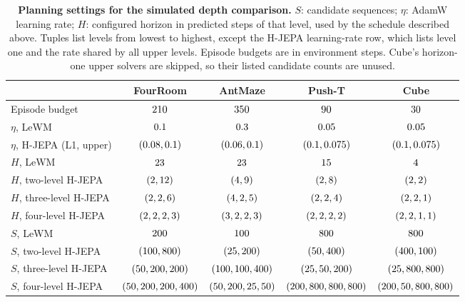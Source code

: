 \begin{table}[ht]
\centering
\small
\setlength{\tabcolsep}{3.5pt}   
\caption{\textbf{Planning settings for the simulated depth comparison.}
$S$: candidate sequences; $\eta$: AdamW learning rate; $H$: configured horizon
in predicted steps of that level, used by the schedule described above. Tuples
list levels from lowest to highest, except the H-JEPA learning-rate row, which
lists level one and the rate shared by all upper levels. Episode budgets are in
environment steps. Cube's horizon-one upper solvers are skipped, so their listed
candidate counts are unused.}
\label{tab:impl-planning}
\begin{tabular}{lcccc}
\toprule
 & FourRoom & AntMaze & Push-T & Cube \\
\midrule
Episode budget & $210$ & $350$ & $90$ & $30$ \\
$\eta$, LeWM & $0.1$ & $0.3$ & $0.05$ & $0.05$ \\
$\eta$, H-JEPA (L1, upper) & $(0.08, 0.1)$ & $(0.06, 0.1)$ & $(0.1, 0.075)$ & $(0.1, 0.075)$ \\
\midrule
$H$, LeWM & $23$ & $23$ & $15$ & $4$ \\
$H$, two-level H-JEPA & $(2, 12)$ & $(4, 9)$ & $(2, 8)$ & $(2, 2)$ \\
$H$, three-level H-JEPA & $(2, 2, 6)$ & $(4, 2, 5)$ & $(2, 2, 4)$ & $(2, 2, 1)$ \\
$H$, four-level H-JEPA & $(2, 2, 2, 3)$ & $(3, 2, 2, 3)$ & $(2, 2, 2, 2)$ & $(2, 2, 1, 1)$ \\
\midrule
$S$, LeWM & $200$ & $100$ & $800$ & $800$ \\
$S$, two-level H-JEPA & $(100, 800)$ & $(25, 200)$ & $(50, 400)$ & $(400, 100)$ \\
$S$, three-level H-JEPA & $(50, 200, 200)$ & $(100, 100, 400)$ & $(25, 50, 200)$ & $(25, 800, 800)$ \\
$S$, four-level H-JEPA & $(50, 200, 200, 400)$ & $(50, 200, 25, 50)$ & $(200, 800, 800, 800)$ & $(200, 50, 800, 800)$ \\
\bottomrule
\end{tabular}
\end{table}

